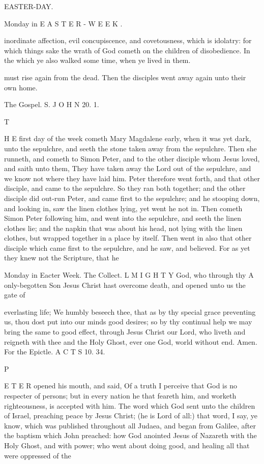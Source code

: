 EASTER-DAY.

Monday in E A S T E R - W E E K .

inordinate affection, evil concupiscence, and covetousness, which is idolatry: for which things sake the wrath of God cometh on the children of disobedience. In the which ye also walked some time, when ye lived in them.

must rise again from the dead. Then the disciples went away again unto their own home.

The Gospel. S. J O H N 20. 1.

T

H E first day of the week cometh Mary Magdalene early, when it was yet dark, unto the sepulchre, and seeth the stone taken away from the sepulchre. Then she runneth, and cometh to Simon Peter, and to the other disciple whom Jesus loved, and saith unto them, They have taken away the Lord out of the sepulchre, and we know not where they have laid him. Peter therefore went forth, and that other disciple, and came to the sepulchre. So they ran both together; and the other disciple did out-run Peter, and came first to the sepulchre; and he stooping down, and looking in, saw the linen clothes lying, yet went he not in. Then cometh Simon Peter following him, and went into the sepulchre, and seeth the linen clothes lie; and the napkin that was about his head, not lying with the linen clothes, but wrapped together in a place by itself. Then went in also that other disciple which came first to the sepulchre, and he saw, and believed. For as yet they knew not the Scripture, that he

Monday in Eacter Week. The Collect. L M I G H T Y God, who through thy A only-begotten Son Jesus Christ hast overcome death, and opened unto us the gate of

everlasting life; We humbly beseech thee, that as by thy special grace preventing us, thou dost put into our minds good desires; so by thy continual help we may bring the same to good effect, through Jesus Christ our Lord, who liveth and reigneth with thee and the Holy Ghost, ever one God, world without end. Amen. For the Epictle. A C T S 10. 34.

P

E T E R opened his mouth, and said, Of a truth I perceive that God is no respecter of persons; but in every nation he that feareth him, and worketh righteousness, is accepted with him. The word which God sent unto the children of Israel, preaching peace by Jesus Christ; (he is Lord of all:) that word, I say, ye know, which was published throughout all Judaea, and began from Galilee, after the baptism which John preached: how God anointed Jesus of Nazareth with the Holy Ghost, and with power; who went about doing good, and healing all that were oppressed of the

